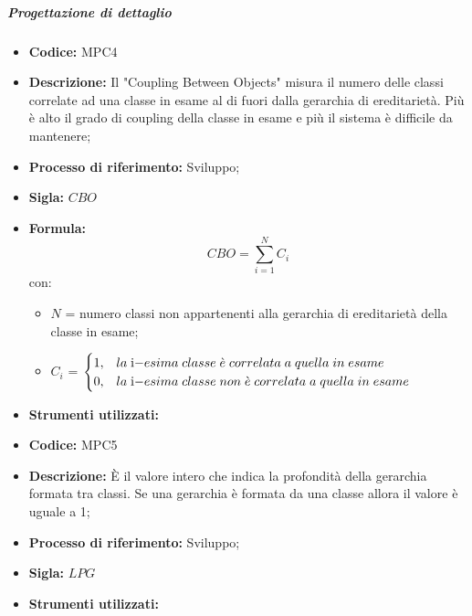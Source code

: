 \subparagraph{Progettazione di dettaglio}
    \begin{itemize}
        \item \textbf{Codice:} MPC4
        \item \textbf{Descrizione:} Il "Coupling Between Objects" misura il numero delle classi correlate ad una classe in esame al di fuori dalla gerarchia di ereditarietà. Più è alto il grado di coupling della classe in esame e più il sistema è difficile da mantenere;
        \item \textbf{Processo di riferimento:} Sviluppo;
        \item \textbf{Sigla:} $CBO$
        \item \textbf{Formula:} $$CBO = {\sum_{i=1}^{N} C_i}$$
        con:
        \begin{itemize}
            \item $N$ = numero classi non appartenenti alla gerarchia di ereditarietà della classe in esame;
            \item $C_i$ =
            \begin{math} {
                \begin{cases}
                    1, & la \; $i$-esima \; classe \; \grave{e} \; correlata \; a \; quella \; in \; esame \\
                    0, & la \; $i$-esima \; classe \; non \; \grave{e} \; correlata \; a \; quella \; in \; esame
                \end{cases}
            }
            \end{math}
        \end{itemize}
        \item \textbf{Strumenti utilizzati:}
    \end{itemize}

    \begin{itemize}
        \item \textbf{Codice:} MPC5
        \item \textbf{Descrizione:} È il valore intero che indica la profondità della gerarchia formata tra classi. Se una gerarchia è formata da una classe allora il valore è uguale a 1;
        \item \textbf{Processo di riferimento:} Sviluppo;
        \item \textbf{Sigla:} $LPG$
        \item \textbf{Strumenti utilizzati:}
    \end{itemize}

